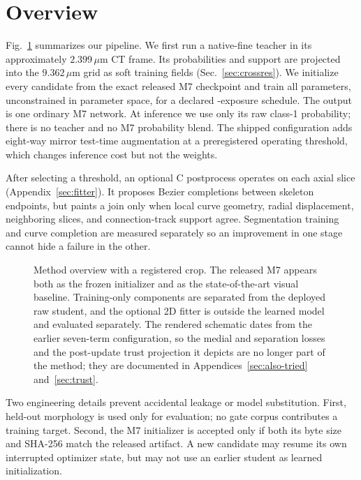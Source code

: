 \section{Overview}
\label{sec:overview}

Fig.~\ref{fig:overview} summarizes our pipeline.
We first run a native-fine teacher in its approximately $2.399\,\mu$m CT frame.
Its probabilities and support are projected into the $9.362\,\mu$m grid as soft
training fields (Sec.~\ref{sec:crossres}).
We initialize every candidate from the exact released M7 checkpoint and train
all parameters, unconstrained in parameter space, for a declared
\fzHorizon-exposure schedule.
The output is one ordinary M7 network.
At inference we use only its raw class-1 probability; there is no teacher and no
M7 probability blend.
The shipped configuration adds eight-way mirror test-time augmentation at a
preregistered operating threshold, which changes inference cost but not the
weights.

After selecting a threshold, an optional C postprocess operates on each axial
slice (Appendix~\ref{sec:fitter}). It proposes Bezier completions between
skeleton endpoints, but paints a join only when local curve geometry, radial
displacement, neighboring slices, and connection-track support agree.
Segmentation training and curve completion are measured separately so an
improvement in one stage cannot hide a failure in the other.

\begin{figure}[t]
  \centering
  \caption{Method overview with a registered crop. The released M7 appears both
  as the frozen initializer and as the state-of-the-art visual baseline.
  Training-only components are separated from the deployed raw student, and the
  optional 2D fitter is outside the learned model and evaluated separately.
  The rendered schematic dates from the earlier seven-term configuration, so
  the medial and separation losses and the post-update trust projection it
  depicts are no longer part of the method; they are documented in
  Appendices~\ref{sec:also-tried} and~\ref{sec:trust}.}
  \label{fig:overview}
\end{figure}

Two engineering details prevent accidental leakage or model substitution.
First, held-out morphology is used only for evaluation; no gate corpus
contributes a training target.
Second, the M7 initializer is accepted only if both its byte size and SHA-256
match the released artifact. A new candidate may resume its own interrupted
optimizer state, but may not use an earlier student as learned initialization.
